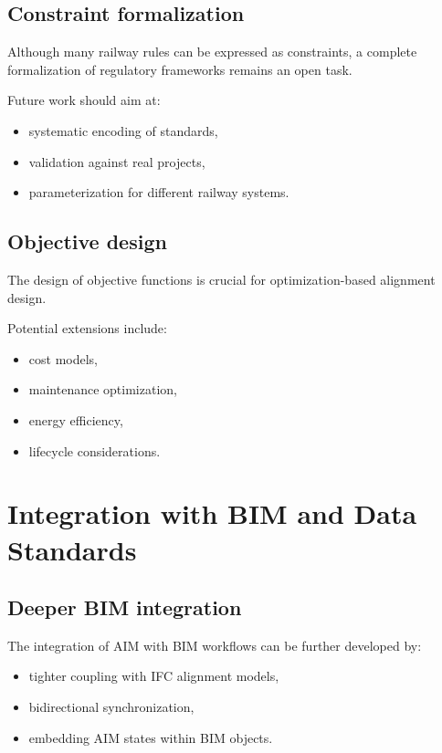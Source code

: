 \subsection{Constraint formalization}

Although many railway rules can be expressed as constraints, a complete
formalization of regulatory frameworks remains an open task.

Future work should aim at:
\begin{itemize}
\item systematic encoding of standards,
\item validation against real projects,
\item parameterization for different railway systems.
\end{itemize}

\subsection{Objective design}

The design of objective functions is crucial for optimization-based
alignment design.

Potential extensions include:
\begin{itemize}
\item cost models,
\item maintenance optimization,
\item energy efficiency,
\item lifecycle considerations.
\end{itemize}


\section{Integration with BIM and Data Standards}

\subsection{Deeper BIM integration}

The integration of AIM with BIM workflows can be further developed by:
\begin{itemize}
\item tighter coupling with IFC alignment models,
\item bidirectional synchronization,
\item embedding AIM states within BIM objects.
\end{itemize}

